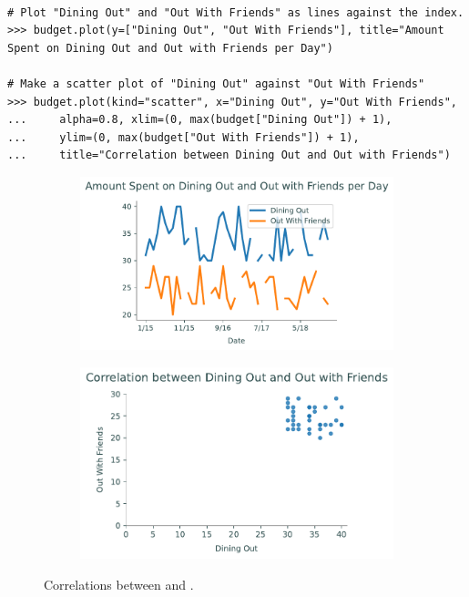 \begin{lstlisting}

# Plot "Dining Out" and "Out With Friends" as lines against the index.
>>> budget.plot(y=["Dining Out", "Out With Friends"], title="Amount Spent on Dining Out and Out with Friends per Day")

# Make a scatter plot of "Dining Out" against "Out With Friends"
>>> budget.plot(kind="scatter", x="Dining Out", y="Out With Friends",
... 	alpha=0.8, xlim=(0, max(budget["Dining Out"]) + 1),
...		ylim=(0, max(budget["Out With Friends"]) + 1),
...     title="Correlation between Dining Out and Out with Friends")
\end{lstlisting}

\begin{figure}[H]
\captionsetup[subfigure]{justification=centering}
\centering
\begin{subfigure}{.49\textwidth}
    \includegraphics[width=\textwidth]{figures/line_compare.pdf}
\end{subfigure}
%
\begin{subfigure}{.49\textwidth}
    \includegraphics[width=\textwidth]{figures/scatter_compare.pdf}
\end{subfigure}
\caption{Correlations between  and .}
\end{figure}

